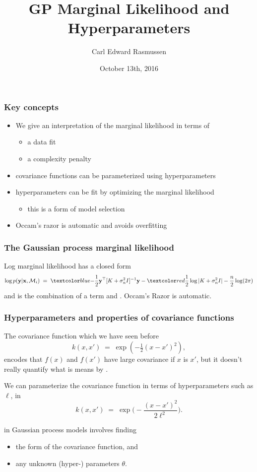 

\title{GP Marginal Likelihood and Hyperparameters}
\author{Carl Edward Rasmussen}
\date{October 13th, 2016}



\begin{frame}
\titlepage
\end{frame}

\begin{frame}
\frametitle{Key concepts}
\begin{itemize}
\item We give an interpretation of the marginal likelihood in terms of
\begin{itemize}
\item a data fit
\item a complexity penalty
\end{itemize}
\item covariance functions can be parameterized using hyperparameters
\item hyperparameters can be fit by optimizing the marginal likelihood
\begin{itemize}
\item this is a form of model selection
\end{itemize}
\item Occam's razor is automatic and avoids overfitting
\end{itemize}
\end{frame}

\begin{frame}
\frametitle{The Gaussian process marginal likelihood}

Log marginal likelihood has a closed form
\[
\log p({\bf y}|{\bf x},\mathcal{M}_i)\;=\;\Blue{-\frac{1}{2}{\bf y}
^\top [K+\sigma_n^2I]^{-1}{\bf y}}
-\Red{\frac{1}{2}\log|K+\sigma_n^2I|}-\frac{n}{2}\log(2\pi)
\]
and is the combination of a  term and .
Occam's Razor is automatic.
\end{frame}


\begin{frame}
\frametitle{Hyperparameters and properties of covariance functions}

The covariance function which we have seen before
\[
k(x,x')\;=\;\exp(-\tfrac{1}{2}(x-x')^2),
\]
encodes that $f(x)$ and $f(x')$ have large covariance if $x$ is
 $x'$, but it doesn't really quantify what is means by
.

We can parameterize the covariance function in terms of
hyperparameters such as $\ell$, in
\[
k(x,x')\;=\;\exp\big(-\frac{(x-x')^2}{2\ell^2}\big).
\]

 in Gaussian process models involves finding
\begin{itemize}
\item the form of the covariance function, and
\item any unknown (hyper-) parameters $\theta$.
\end{itemize}

\end{frame}

